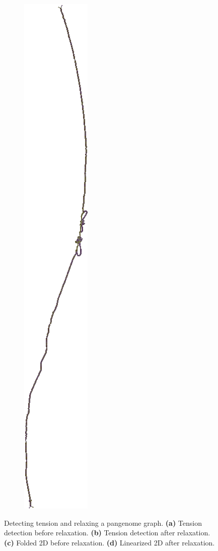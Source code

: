 \begin{figure}[!htb]
\begin{subfigure}[t]{0.1\textwidth}
		\label{fig:tension_draw}
	\end{subfigure}
	\begin{subfigure}[t]{0.1\textwidth}
		\centering
		\caption{}
		\includegraphics[width=\linewidth]{fig/tension/layout_relaxed.png}
		\label{fig:tension_draw_extracted}
	\end{subfigure}
	\caption{
		Detecting tension and relaxing a pangenome graph.
		\textbf{(a)} Tension detection before relaxation. \textbf{(b)} Tension detection after relaxation. \textbf{(c)} Folded 2D before relaxation. \textbf{(d)} Linearized 2D after relaxation.
	}
	\label{fig:tension}
\end{figure}